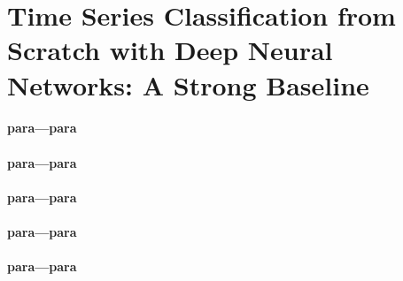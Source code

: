 \section{Time Series Classification from Scratch with Deep Neural Networks: A Strong Baseline}

\paragraph*{para---para
    \textcolor[RGB]{17, 205, 29}{}}
\begin{quotation}
    \itshape

\end{quotation}

\paragraph*{para---para
    \textcolor[RGB]{17, 205, 29}{}}
\begin{quotation}
    \itshape

\end{quotation}

\paragraph*{para---para
    \textcolor[RGB]{17, 205, 29}{}}
\begin{quotation}
    \itshape

\end{quotation}

\paragraph*{para---para
    \textcolor[RGB]{17, 205, 29}{}}
\begin{quotation}
    \itshape

\end{quotation}

\paragraph*{para---para
    \textcolor[RGB]{17, 205, 29}{}}
\begin{quotation}
    \itshape

\end{quotation}